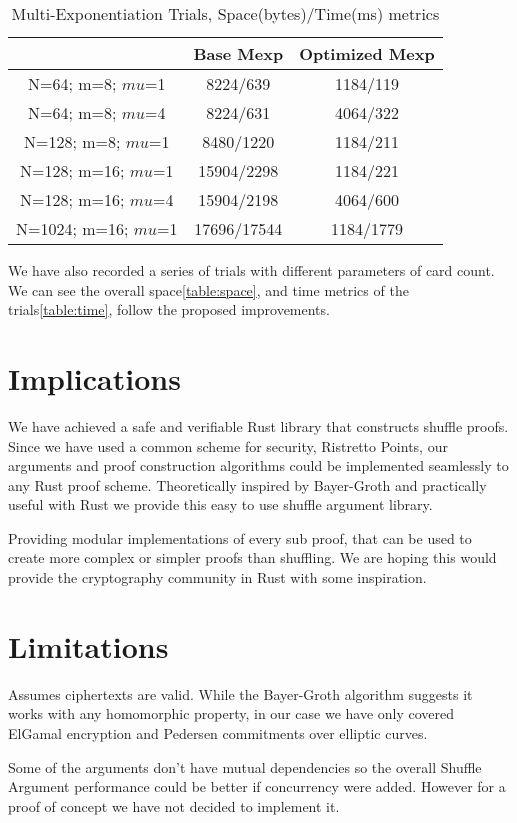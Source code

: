 \documentclass[12pt,a4paper]{report}
\begin{document}
\begin{table}
	\begin{center}
	\begin{tabular}{||c|c|c||}\hline
		\backslashbox{Parameters}{Proof Type} & Base Mexp& Optimized Mexp\\
		\hline
		N=64; m=8; $mu$=1 & 8224/639 & 1184/119\\
		\hline
		N=64; m=8; $mu$=4 & 8224/631 & 4064/322 \\
		\hline
		N=128; m=8; $mu$=1 & 8480/1220 & 1184/211\\
		\hline
		N=128; m=16; $mu$=1 & 15904/2298 & 1184/221\\
		\hline
		N=128; m=16; $mu$=4 & 15904/2198 & 4064/600\\
		\hline
		N=1024; m=16; $mu$=1 & 17696/17544 & 1184/1779\\
		\hline
	\end{tabular}
	\end{center}
	\caption{Multi-Exponentiation Trials, Space(bytes)/Time(ms) metrics}
	\label{table:mexp}
\end{table}

We have also recorded a series of trials with different parameters of card count. We can see the overall space\ref{table:space}, and time metrics of the trials\ref{table:time}, follow the proposed improvements.

\section{Implications}
We have achieved a safe and verifiable Rust library that constructs shuffle proofs.
Since we have used a common scheme for security, Ristretto Points, our arguments and proof construction algorithms could be implemented seamlessly to any Rust proof scheme.
Theoretically inspired by Bayer-Groth and practically useful with Rust we provide this easy to use shuffle argument library.\par
Providing modular implementations of every sub proof, that can be used to create more complex or simpler proofs than shuffling.
We are hoping this would provide the cryptography community in Rust with some inspiration.
\section{Limitations}
Assumes ciphertexts are valid.
While the Bayer-Groth algorithm suggests it works with any homomorphic property,
in our case we have only covered ElGamal encryption and Pedersen commitments over elliptic curves.\par
Some of the arguments don't have mutual dependencies so the overall Shuffle Argument performance
could be better if concurrency were added. However for a proof of concept we have not decided to implement it.
\end{document}
